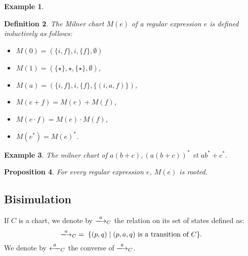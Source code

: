 \documentclass{article}
\newtheorem{definition}{Definition}[section]
\newtheorem{proposition}[definition]{Proposition}
\newtheorem{example}[definition]{Example}
\begin{document}
\begin{example}
\begin{center}
\end{center}
\end{example}
\begin{definition}
The \emph{Milner chart} $M(e)$ of a regular expression $e$ is defined inductively as follows:
\begin{itemize}
        \item $M(0) = (\{i, f\}, i, \{f\}, \emptyset)$
    \item $M(1) = (\{\star\}, \star, \{\star\}, \emptyset)$,
    \item $M(a) = (\{i, f\}, i, \{f\}, \{(i, a, f)\})$, 
    \item $M(e+f) = M(e) + M(f)$,
    \item $M(e \cdot f) = M(e) \cdot M(f)$,
    \item $M(e^*) = M(e)^*$.
\end{itemize}
\end{definition}

\begin{example} The milner chart of $a(b+c), (a(b+c))^*$ et $ab^*+c^*$.
\end{example}

\begin{proposition}
For every regular expression $e$, $M(e)$ is rooted.
\end{proposition}

\subsection{Bisimulation}
\begin{notation}
    If $C$ is a chart, we denote by $\xlongrightarrow{a}_{C}$ the relation on its set of states defined as:
    $$\xlongrightarrow{a}_{C} \;=\; \{ (p,q) \mid (p,a,q) \text{ is a transition of } C \}.$$
    We denote by $\xlongleftarrow{a}_{C}$ the converse of $\xlongrightarrow{a}_{C}$.
\end{notation}
\end{document}
